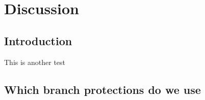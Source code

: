\chapter{Discussion}
\section{Introduction}
This is another test \cite{nbimattacks}

\section{Which branch protections do we use}

